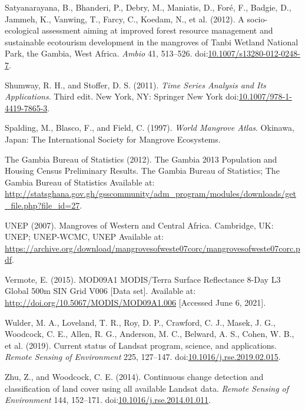 \documentclass[utf8]{frontiersSCNS}
\newlength{\cslhangindent}
\newlength{\cslentryspacingunit} %
\newenvironment{CSLReferences}[2] %
 {%
  \setlength{\parindent}{0pt}
  \ifodd #1
  \let\oldpar\par
  \def\par{\hangindent=\cslhangindent\oldpar}
  \fi
  \setlength{\parskip}{#2\cslentryspacingunit}
 }%
 {}
\begin{document}
\begin{CSLReferences}{1}{0}
\leavevmode\hypertarget{ref-Satyanarayana-et-al-2012}{}%
Satyanarayana, B., Bhanderi, P., Debry, M., Maniatis, D., Foré, F.,
Badgie, D., Jammeh, K., Vanwing, T., Farcy, C., Koedam, N., et al.
(2012). {A socio-ecological assessment aiming at improved forest
resource management and sustainable ecotourism development in the
mangroves of Tanbi Wetland National Park, the Gambia, West Africa}.
\emph{Ambio} 41, 513--526.
doi:\href{https://doi.org/10.1007/s13280-012-0248-7}{10.1007/s13280-012-0248-7}.

\leavevmode\hypertarget{ref-Shumway-and-Stoffer-2011}{}%
Shumway, R. H., and Stoffer, D. S. (2011). \emph{{Time Series Analysis
and Its Applications}}. Third edit. New York, NY: Springer New York
doi:\href{https://doi.org/10.1007/978-1-4419-7865-3}{10.1007/978-1-4419-7865-3}.

\leavevmode\hypertarget{ref-Spalding-et-al-1997}{}%
Spalding, M., Blasco, F., and Field, C. (1997). \emph{{World Mangrove
Atlas}}. Okinawa, Japan: The International Society for Mangrove
Ecosystems.

\leavevmode\hypertarget{ref-TheGambiaBureauofStatistics-2013}{}%
The Gambia Bureau of Statistics (2012). {The Gambia 2013 Population and
Housing Census Preliminary Results}. The Gambia Bureau of Statistics;
The Gambia Bureau of Statistics Available at:
\url{http://statsghana.gov.gh/gsscommunity/adm_program/modules/downloads/get_file.php?file_id=27}.

\leavevmode\hypertarget{ref-UNEP-2007}{}%
UNEP (2007). {Mangroves of Western and Central Africa}. Cambridge, UK:
UNEP; UNEP-WCMC, UNEP Available at:
\url{https://archive.org/download/mangrovesofweste07corc/mangrovesofweste07corc.pdf}.

\leavevmode\hypertarget{ref-Vermote-2015}{}%
Vermote, E. (2015). {MOD09A1 MODIS/Terra Surface Reflectance 8-Day L3
Global 500m SIN Grid V006 {[}Data set{]}}. Available at:
\url{http://doi.org/10.5067/MODIS/MOD09A1.006} {[}Accessed June 6,
2021{]}.

\leavevmode\hypertarget{ref-Wulder-et-al-2019}{}%
Wulder, M. A., Loveland, T. R., Roy, D. P., Crawford, C. J., Masek, J.
G., Woodcock, C. E., Allen, R. G., Anderson, M. C., Belward, A. S.,
Cohen, W. B., et al. (2019). {Current status of Landsat program,
science, and applications}. \emph{Remote Sensing of Environment} 225,
127--147.
doi:\href{https://doi.org/10.1016/j.rse.2019.02.015}{10.1016/j.rse.2019.02.015}.

\leavevmode\hypertarget{ref-Zhu-and-Woodcock-2014}{}%
Zhu, Z., and Woodcock, C. E. (2014). {Continuous change detection and
classification of land cover using all available Landsat data}.
\emph{Remote Sensing of Environment} 144, 152--171.
doi:\href{https://doi.org/10.1016/j.rse.2014.01.011}{10.1016/j.rse.2014.01.011}.

\end{CSLReferences}
\end{document}
